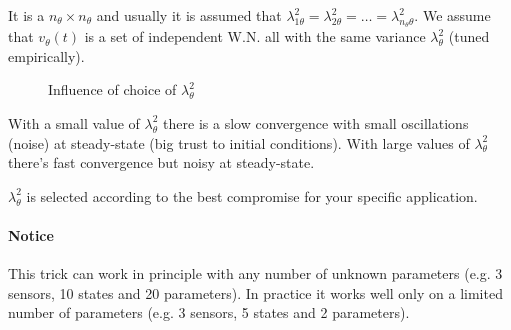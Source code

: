 It is a $n_\theta\times n_\theta$ and usually it is assumed that $\lambda_{1\theta}^2=\lambda_{2\theta}^2=\dots=\lambda_{n_\theta\theta}^2$.
We assume that $v_\theta(t)$ is a set of independent W.N. all with the same variance $\lambda_\theta^2$ (tuned empirically).

\begin{figure}[H]
    \centering
    \caption*{Influence of choice of $\lambda_\theta^2$}
\end{figure}

With a small value of $\lambda_\theta^2$ there is a slow convergence with small oscillations (noise) at steady-state (big trust to initial conditions).
With large values of $\lambda_\theta^2$ there's fast convergence but noisy at steady-state.

$\lambda_\theta^2$ is selected according to the best compromise for your specific application.

\paragraph{Notice} This trick can work in principle with any number of unknown parameters (e.g. 3 sensors, 10 states and 20 parameters).
In practice it works well only on a limited number of parameters (e.g. 3 sensors, 5 states and 2 parameters).

